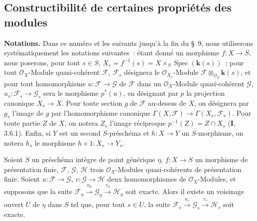 
\subsection{Constructibilité de certaines propriétés des modules}
\label{subsection:IV.9.4-fr}

\begin{env}[9.4.1]
\label{IV.9.4.1-fr}
\textbf{Notations.} Dans ce numéro et les suivants jusqu'à la fin du \S~9,
nous utiliserons systématiquement les notations suivantes~: étant donné un
morphisme $f:X\to S$, nous poserons, pour tout $s\in S$,
$X_s=f^{-1}(s)=X\times_S\operatorname{Spec}(\mathbf{k}(s))$~; pour tout
$\mathcal O_X$-Module quasi-cohérent $\mathcal F$, $\mathcal F_s$ désignera
le $\mathcal O_{X_s}$-Module
$\mathcal F\otimes_{\mathcal O_S}\mathbf{k}(s)$, et pour tout homomorphisme
$u:\mathcal F\to\mathcal G$ de $\mathcal F$ dans un $\mathcal O_X$-Module
quasi-cohérent $\mathcal G$, $u_s:\mathcal F_s\to\mathcal G_s$ sera le
morphisme $p^*(u)$, en désignant par $p$ la projection canonique $X_s\to X$.
Pour toute section $g$ de $\mathcal F$ au-dessus de $X$, on désignera par
$g_s$ l'image de $g$ par l'homomorphisme canonique
$\Gamma(X,\mathcal F)\to\Gamma(X_s,\mathcal F_s)$. Pour toute partie $Z$ de
$X$, on notera $Z_s$ l'image réciproque
$p^{-1}(Z)=Z\cap X_s$ (\textbf{I}, 3.6.1). Enfin, si $Y$ est un second
$S$-préschéma et $h:X\to Y$ un $S$-morphisme, on notera $h_s$ le morphisme
$h\times1:X_s\to Y_s$.
\end{env}

\begin{proposition}[9.4.2]
\label{IV.9.4.2-fr}
Soient $S$ un préschéma intègre de point générique $\eta$, $f:X\to S$ un
morphisme de présentation finie, $\mathcal F$, $\mathcal G$, $\mathcal H$
trois $\mathcal O_X$-Modules quasi-cohérents de présentation finie. Soient
$u:\mathcal F\to\mathcal G$, $v:\mathcal G\to\mathcal H$ deux
homomorphismes de $\mathcal O_X$-Modules, et supposons que la suite
$\mathcal F_\eta\xrightarrow{u_\eta}\mathcal G_\eta
\xrightarrow{v_\eta}\mathcal H_\eta$ soit exacte. Alors il existe un
voisinage ouvert $U$ de $\eta$ dans $S$ tel que, pour tout $s\in U$, la suite
$\mathcal F_s\xrightarrow{u_s}\mathcal G_s
\xrightarrow{v_s}\mathcal H_s$ soit exacte.
\end{proposition}

